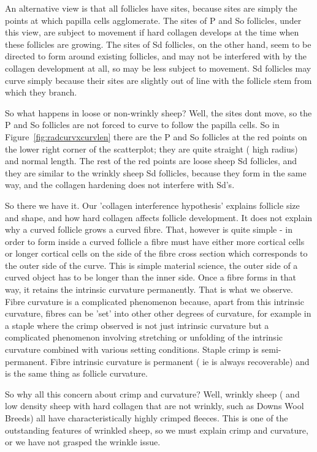 \documentclass[titlepage]{article}  %
\begin{document}
An alternative view is that all follicles have sites, because sites are simply the points at which papilla cells agglomerate. The sites of P and So follicles, under this view, are subject to movement if hard collagen develops at the time when these follicles are growing. The sites of Sd follicles, on the other hand, seem to be directed to form around existing follicles, and may not be interfered with by the collagen development at all, so may be less subject to movement. Sd follicles may curve simply because their sites are  slightly out of line with the follicle stem from which they branch.

So what happens in loose or non-wrinkly sheep? Well, the sites dont move, so the P and So follicles are not forced to curve to follow the papilla cells. So in Figure~\ref{fig:radcurvxcurvlen} there are the P and So follicles at the red points on the lower right corner of the scatterplot; they are quite straight ( high radius) and normal length. The rest of the red points are loose sheep Sd follicles, and they are similar to the wrinkly sheep Sd follicles, because they form in the same way, and the collagen hardening does not interfere with Sd's.

So there we have it. Our 'collagen interference hypothesis' explains  follicle size and shape, and how hard collagen affects follicle development. It does not explain why a curved follicle grows a curved fibre. That, however is quite simple - in order to form inside a curved follicle a fibre must have either more cortical cells or longer cortical cells on the side of the fibre cross section which corresponds to the outer side of the curve. This is simple material science, the outer side of a curved object has to be longer than the inner side. Once a fibre forms in  that way, it retains the intrinsic curvature permanently. That is what we observe. Fibre curvature is a complicated phenomenon because, apart from this intrinsic curvature, fibres can be 'set' into other other degrees of curvature, for example in a staple where the crimp observed is not just intrinsic curvature but a complicated phenomenon involving stretching or unfolding of the intrinsic curvature combined with various setting conditions. Staple crimp is semi-permanent. Fibre intrinsic curvature is permanent ( ie is always recoverable) and is the same thing as follicle curvature.

So why all this concern about crimp and curvature? Well, wrinkly sheep ( and  low density sheep with hard collagen that are not wrinkly, such as Downs Wool Breeds)  all have characteristically highly crimped fleeces. This is one of the outstanding features of wrinkled sheep, so we must explain crimp and curvature, or we have not grasped the wrinkle issue.
\end{document}
